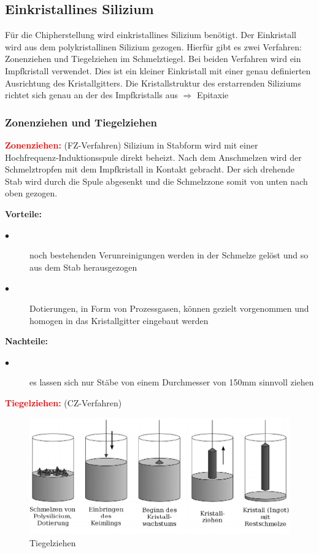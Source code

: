 \subsection{Einkristallines Silizium}
	Für die Chipherstellung wird einkristallines Silizium benötigt. Der Einkristall wird aus dem polykristallinen Silizium gezogen. Hierfür gibt es zwei Verfahren: Zonenziehen und Tiegelziehen im Schmelztiegel. Bei beiden Verfahren wird ein Impfkristall verwendet. Dies ist ein kleiner Einkristall mit einer genau definierten Ausrichtung des Kristallgitters. Die Kristallstruktur des erstarrenden Siliziums richtet sich genau an der des Impfkristalls aus $\Rightarrow$ Epitaxie
	
	\subsubsection{Zonenziehen und Tiegelziehen}
		\textcolor{red}{\textbf{Zonenziehen:}} (FZ-Verfahren)
			Silizium in Stabform wird mit einer Hochfrequenz-Induktionsspule direkt beheizt. Nach dem Anschmelzen wird der Schmelztropfen mit dem Impfkristall in Kontakt gebracht. Der sich drehende Stab wird durch die Spule abgesenkt und die Schmelzzone somit von unten nach oben gezogen.
			
			\textbf{Vorteile:}
				\begin{description}
					\item[$\bullet$] noch bestehenden Verunreinigungen werden in der Schmelze gelöst und so aus dem Stab herausgezogen
					\item[$\bullet$] Dotierungen, in Form von Prozessgasen, können gezielt vorgenommen und homogen in das Kristallgitter eingebaut werden
				\end{description}
			\textbf{Nachteile:}
			\begin{description}
				\item[$\bullet$] es lassen sich nur Stäbe von einem Durchmesser von 150mm sinnvoll ziehen
			\end{description}
				
			
		\textcolor{red}{\textbf{Tiegelziehen:}} (CZ-Verfahren)
		
		\begin{figure}[h!]
			\centering
			\includegraphics[width=\textwidth]{Kapitel/Kap02/tiegelziehen.PNG}
			\caption{Tiegelziehen}
			\label{02_tiegelziehen}
		\end{figure}
		
